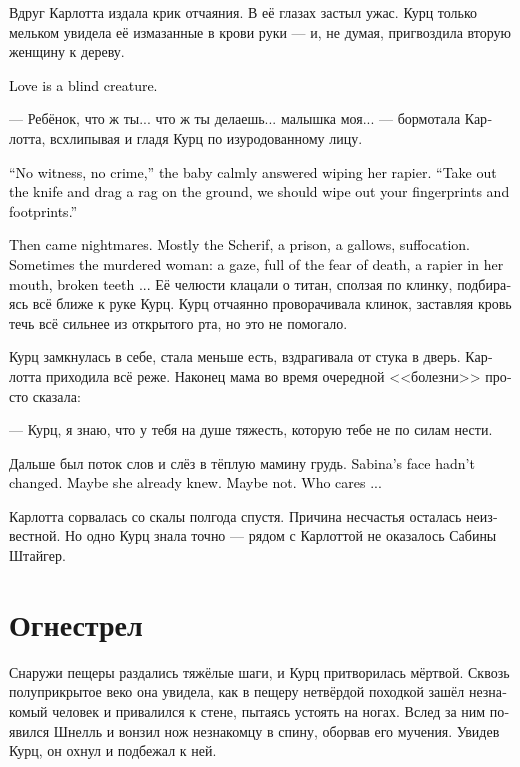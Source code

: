 \documentclass[a4paper,12pt,fleqn]{book}\usepackage{cooltooltips}\usepackage{polyglossia}\setdefaultlanguage[babelshorthands=true]{russian}\setotherlanguage{english}\defaultfontfeatures{Ligatures=TeX,Mapping=tex-text} \usepackage{xcolor}\definecolor{lightgray}{HTML}{bbbbbb}\color{lightgray}\newcommand{\ml}[3]{\textenglish{\textcolor{black}{#3}}}
\begin{document}
Вдруг Карлотта издала крик отчаяния.
В её глазах застыл ужас.
Курц только мельком увидела её измазанные в крови руки --- и, не думая, пригвоздила вторую женщину к дереву.

\ml{$0$}
{Любовь слепа.}
{Love is a blind creature.}

--- Ребёнок, что ж ты... что ж ты делаешь... малышка моя... --- бормотала Карлотта, всхлипывая и гладя Курц по изуродованному лицу.

\ml{$0$}
{--- Нет свидетелей --- нет преступления, --- спокойно заявил ребёнок, вытирая рапиру.}
{``No witness, no crime,'' the baby calmly answered wiping her rapier.}
\ml{$0$}
{--- Нож вытащи и по земле потаскай тряпку, надо избавиться от твоих отпечатков и следов.}
{``Take out the knife and drag a rag on the ground, we should wipe out your fingerprints and footprints.''}

\ml{$0$}
{Потом были кошмары.}
{Then came nightmares.}
\ml{$0$}
{В основном шериф, тюрьма, виселица, ощущение нехватки воздуха.}
{Mostly the Scherif, a prison, a gallows, suffocation.}
\ml{$0$}
{Иногда снилась убитая --- полный ужаса взгляд умирающего, торчащая изо рта рапира, выбитые зубы...}
{Sometimes the murdered woman: a gaze, full of the fear of death, a rapier in her mouth, broken teeth ...}
Её челюсти клацали о титан, сползая по клинку, подбираясь всё ближе к руке Курц.
Курц отчаянно проворачивала клинок, заставляя кровь течь всё сильнее из открытого рта, но это не помогало.

Курц замкнулась в себе, стала меньше есть, вздрагивала от стука в дверь.
Карлотта приходила всё реже.
Наконец мама во время очередной <<болезни>> просто сказала:

--- Курц, я знаю, что у тебя на душе тяжесть, которую тебе не по силам нести.

Дальше был поток слов и слёз в тёплую мамину грудь.
\ml{$0$}
{Сабина не изменилась в лице.}
{Sabina's face hadn't changed.}
\ml{$0$}
{Может, она уже знала.}
{Maybe she already knew.}
\ml{$0$}
{А может, и нет.}
{Maybe not.}
\ml{$0$}
{Какая разница...}
{Who cares ...}

Карлотта сорвалась со скалы полгода спустя.
Причина несчастья осталась неизвестной.
Но одно Курц знала точно --- рядом с Карлоттой не оказалось Сабины Штайгер.

\section{Огнестрел}

Снаружи пещеры раздались тяжёлые шаги, и Курц притворилась мёртвой.
Сквозь полуприкрытое веко она увидела, как в пещеру нетвёрдой походкой зашёл незнакомый человек и привалился к стене, пытаясь устоять на ногах.
Вслед за ним появился Шнелль и вонзил нож незнакомцу в спину, оборвав его мучения.
Увидев Курц, он охнул и подбежал к ней.
\end{document}
